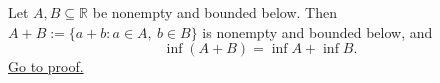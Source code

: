 \begin{theorem}
\label{thm:infimum-sum-set}
Let $A,B\subseteq\mathbb{R}$ be nonempty and bounded below.  Then
$A+B:=\{a+b:a\in A,\ b\in B\}$ is nonempty and bounded below, and
\[
  \inf(A+B)=\inf A+\inf B.
\]
\hyperref[prf:infimum-sum-set]{Go to proof.}
\end{theorem}